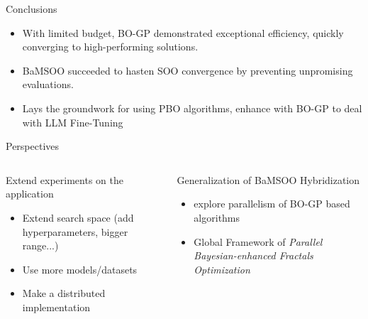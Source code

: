 \begin{frame}{Conclusions}

\begin{itemize}
    \item With limited budget, BO-GP demonstrated exceptional efficiency, quickly converging to high-performing solutions. 
    \item BaMSOO succeeded to hasten SOO convergence by preventing unpromising evaluations.
    \item Lays the groundwork for using PBO algorithms, enhance with BO-GP to deal with LLM Fine-Tuning
\end{itemize}


\end{frame}

\begin{frame}{Perspectives}

    \begin{columns}
        \begin{column}{0.45\textwidth}

            \begin{block}{Extend experiments on the application}
                \begin{itemize}
                    \item Extend search space (add hyperparameters, bigger range...)
                    \item Use more models/datasets
                    \item Make a distributed implementation
                \end{itemize}
            \end{block}
        \end{column}

        \begin{column}{0.45\textwidth}
            \begin{block}{Generalization of BaMSOO Hybridization}

                \begin{itemize}
                    \item explore parallelism of BO-GP based algorithms
                    \item Global Framework of \textit{Parallel Bayesian-enhanced Fractals Optimization} 
                \end{itemize}
            \end{block}
        \end{column}

    \end{columns}
    
\end{frame}